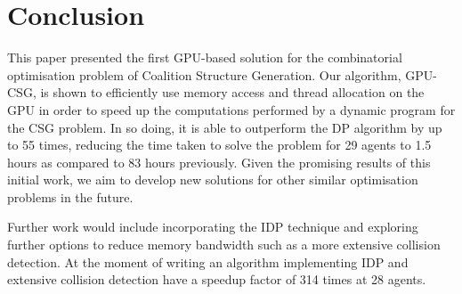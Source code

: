\documentclass{llncs}
\begin{document}
\section{Conclusion}
This paper presented the first GPU-based solution for the combinatorial optimisation problem of Coalition Structure Generation. Our algorithm, GPU-CSG, is shown to efficiently use memory access and thread allocation on the GPU in order to speed up the computations performed by a dynamic program for the CSG problem. In so doing, it is able to outperform the DP algorithm by up to 55 times, reducing the time taken to solve the problem for 29 agents to 1.5 hours as compared to 83 hours previously. Given the promising results of this initial work, we aim to develop new solutions for other similar optimisation problems in the future.

Further work would include incorporating the IDP technique and exploring further options to reduce memory bandwidth such as a more extensive collision detection.
At the moment of writing an algorithm implementing IDP and extensive collision detection have a speedup factor of 314 times at 28 agents.

\end{document}

